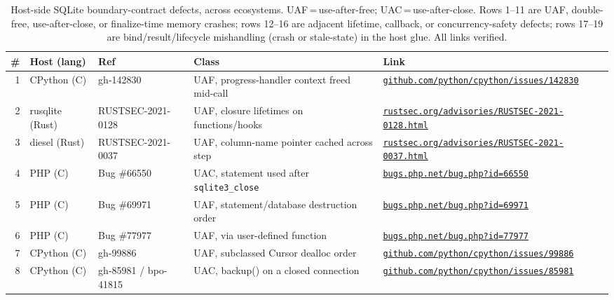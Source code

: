 \documentclass[10pt,twocolumn]{article}
\begin{document}
\begin{table}[t]
\centering
\caption{Host-side SQLite boundary-contract defects, across ecosystems.
UAF\,=\,use-after-free; UAC\,=\,use-after-close. Rows 1--11 are
UAF, double-free, use-after-close, or finalize-time memory crashes; rows
12--16 are adjacent lifetime, callback, or concurrency-safety defects; rows
17--19 are bind/result/lifecycle mishandling (crash or stale-state) in the
host glue. All links verified.}
\label{tab:scope}
\scriptsize
\renewcommand{\arraystretch}{1.18}
\begin{tabular}{@{}r p{2.0cm} p{2.0cm} p{4.0cm} l@{}}
\toprule
\textbf{\#} & \textbf{Host (lang)} & \textbf{Ref} & \textbf{Class} & \textbf{Link} \\
\midrule
1  & CPython (C)        & gh-142830                 & UAF, progress-handler context freed mid-call & \href{https://github.com/python/cpython/issues/142830}{\nolinkurl{github.com/python/cpython/issues/142830}} \\
2  & rusqlite (Rust)    & RUSTSEC-2021-0128         & UAF, closure lifetimes on functions/hooks    & \href{https://rustsec.org/advisories/RUSTSEC-2021-0128.html}{\nolinkurl{rustsec.org/advisories/RUSTSEC-2021-0128.html}} \\
3  & diesel (Rust)      & RUSTSEC-2021-0037         & UAF, column-name pointer cached across step  & \href{https://rustsec.org/advisories/RUSTSEC-2021-0037.html}{\nolinkurl{rustsec.org/advisories/RUSTSEC-2021-0037.html}} \\
4  & PHP (C)            & Bug \#66550               & UAC, statement used after \texttt{sqlite3\_close} & \href{https://bugs.php.net/bug.php?id=66550}{\nolinkurl{bugs.php.net/bug.php?id=66550}} \\
5  & PHP (C)            & Bug \#69971               & UAF, statement/database destruction order    & \href{https://bugs.php.net/bug.php?id=69971}{\nolinkurl{bugs.php.net/bug.php?id=69971}} \\
6  & PHP (C)            & Bug \#77977               & UAF, via user-defined function               & \href{https://bugs.php.net/bug.php?id=77977}{\nolinkurl{bugs.php.net/bug.php?id=77977}} \\
7  & CPython (C)        & gh-99886                  & UAF, subclassed Cursor dealloc order         & \href{https://github.com/python/cpython/issues/99886}{\nolinkurl{github.com/python/cpython/issues/99886}} \\
8  & CPython (C)        & gh-85981 / bpo-41815      & UAC, backup() on a closed connection         & \href{https://github.com/python/cpython/issues/85981}{\nolinkurl{github.com/python/cpython/issues/85981}} \\

\end{tabular}
\end{table}
\end{document}
